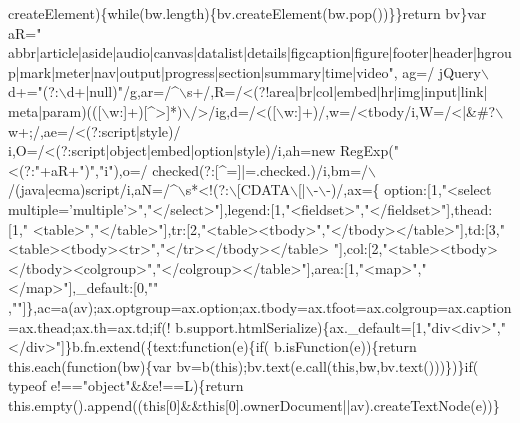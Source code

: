 \begin{DoxyCode}
      createElement)\{\textcolor{keywordflow}{while}(bw.length)\{bv.createElement(bw.pop())\}\}\textcolor{keywordflow}{return} bv\}var aR=\textcolor{stringliteral}{"
      abbr|article|aside|audio|canvas|datalist|details|figcaption|figure|footer|header|hgroup|mark|meter|nav|output|progress|section|summary|time|video"},
      ag=/ jQuery\(\backslash\)d+=\textcolor{stringliteral}{"(?:\(\backslash\)d+|null)"}/g,ar=/^\(\backslash\)s+/,R=/<(?!area|br|col|embed|hr|img|input|link|
      meta|param)(([\(\backslash\)w:]+)[^>]*)\(\backslash\)/>/ig,d=/<([\(\backslash\)w:]+)/,w=/<tbody/i,W=/<|&#?\(\backslash\)w+;/,ae=/<(?:script|style)/
      i,O=/<(?:script|\textcolor{keywordtype}{object}|embed|option|style)/i,ah=\textcolor{keyword}{new} RegExp(\textcolor{stringliteral}{"<(?:"}+aR+\textcolor{stringliteral}{")"},\textcolor{stringliteral}{"i"}),o=/
      checked\s*(?:[^=]|=\s*.checked.)/i,bm=/\(\backslash\)/(java|ecma)script/i,aN=/^\(\backslash\)s*<!(?:\(\backslash\)[CDATA\(\backslash\)[|\(\backslash\)-\(\backslash\)-)/,ax=\{
      option:[1,\textcolor{stringliteral}{"<select multiple='multiple'>"},\textcolor{stringliteral}{"</select>"}],legend:[1,\textcolor{stringliteral}{"<fieldset>"},\textcolor{stringliteral}{"</fieldset>"}],thead:[1,\textcolor{stringliteral}{"
      <table>"},\textcolor{stringliteral}{"</table>"}],tr:[2,\textcolor{stringliteral}{"<table><tbody>"},\textcolor{stringliteral}{"</tbody></table>"}],td:[3,\textcolor{stringliteral}{"<table><tbody><tr>"},\textcolor{stringliteral}{"</tr></tbody></table>
      "}],col:[2,\textcolor{stringliteral}{"<table><tbody></tbody><colgroup>"},\textcolor{stringliteral}{"</colgroup></table>"}],area:[1,\textcolor{stringliteral}{"<map>"},\textcolor{stringliteral}{"</map>"}],\_default:[0,\textcolor{stringliteral}{""}
      ,\textcolor{stringliteral}{""}]\},ac=a(av);ax.optgroup=ax.option;ax.tbody=ax.tfoot=ax.colgroup=ax.caption=ax.thead;ax.th=ax.td;\textcolor{keywordflow}{if}(!
      b.support.htmlSerialize)\{ax.\_default=[1,\textcolor{stringliteral}{"div<div>"},\textcolor{stringliteral}{"</div>"}]\}b.fn.extend(\{text:\textcolor{keyword}{function}(e)\{\textcolor{keywordflow}{if}(
      b.isFunction(e))\{\textcolor{keywordflow}{return} this.each(\textcolor{keyword}{function}(bw)\{var bv=b(\textcolor{keyword}{this});bv.text(e.call(\textcolor{keyword}{this},bw,bv.text()))\})\}\textcolor{keywordflow}{if}(
      typeof e!==\textcolor{stringliteral}{"object"}&&e!==L)\{\textcolor{keywordflow}{return} this.empty().append((\textcolor{keyword}{this}[0]&&\textcolor{keyword}{this}[0].ownerDocument||av).createTextNode(e))\}\textcolor{keywordflow}{
}
\end{DoxyCode}
